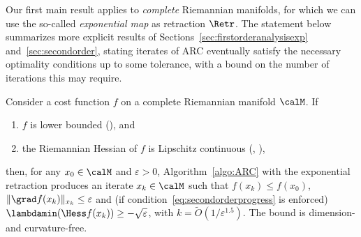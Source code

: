 Our first main result applies to \emph{complete} Riemannian manifolds, for which we can use the so-called \emph{exponential map} as retraction $\Retr$. The statement below summarizes more explicit results of Sections~\ref{sec:firstorderanalysisexp} and~\ref{sec:secondorder}, stating iterates of ARC eventually satisfy the necessary optimality conditions up to some tolerance, with a bound on the number of iterations this may require.
\begin{theorem} \label{thm:informalEXP}
	Consider a cost function $f$ on a complete Riemannian manifold $\calM$. If
	\begin{enumerate}
		\item[a)] $f$ is lower bounded (), and
		\item[b)] the Riemannian Hessian of $f$ is Lipschitz continuous (, ),
	\end{enumerate}
	then, for any $x_0\in\calM$ and $\varepsilon > 0$, Algorithm~\ref{algo:ARC} with the exponential retraction produces an iterate $x_k \in \calM$ such that $f(x_k) \leq f(x_0)$, $\|\grad f(x_k)\|_{x_k} \leq \varepsilon$ and (if condition~\eqref{eq:secondorderprogress} is enforced) $\lambdamin(\Hess f(x_k)) \geq -\sqrt{\varepsilon}$, with $k = \tilde O(1/\varepsilon^{1.5})$. %
	The bound is dimension- and curvature-free.
\end{theorem}


